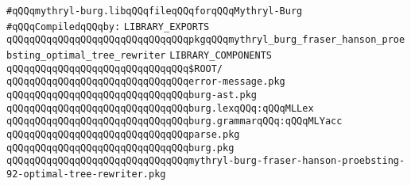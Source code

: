 \label{src/app/burg/mythryl-burg.lib}
\verb|#qQQqmythryl-burg.libqQQqfileqQQqforqQQqMythryl-Burg|\newline
\newline
\verb|#qQQqCompiledqQQqby:|\newline
\newline
\verb|LIBRARY_EXPORTS|\newline
\newline
\verb|qQQqqQQqqQQqqQQqqQQqqQQqqQQqqQQqpkgqQQqmythryl_burg_fraser_hanson_proebsting_optimal_tree_rewriter|\newline
\newline
\newline
\verb|LIBRARY_COMPONENTS|\newline
\newline
\verb|qQQqqQQqqQQqqQQqqQQqqQQqqQQqqQQq$ROOT/|\newline
\newline
\verb|qQQqqQQqqQQqqQQqqQQqqQQqqQQqqQQqerror-message.pkg|\newline
\verb|qQQqqQQqqQQqqQQqqQQqqQQqqQQqqQQqburg-ast.pkg|\newline
\verb|qQQqqQQqqQQqqQQqqQQqqQQqqQQqqQQqburg.lexqQQq:qQQqMLLex|\newline
\verb|qQQqqQQqqQQqqQQqqQQqqQQqqQQqqQQqburg.grammarqQQq:qQQqMLYacc|\newline
\verb|qQQqqQQqqQQqqQQqqQQqqQQqqQQqqQQqparse.pkg|\newline
\verb|qQQqqQQqqQQqqQQqqQQqqQQqqQQqqQQqburg.pkg|\newline
\verb|qQQqqQQqqQQqqQQqqQQqqQQqqQQqqQQqmythryl-burg-fraser-hanson-proebsting-92-optimal-tree-rewriter.pkg|\newline
\newline

